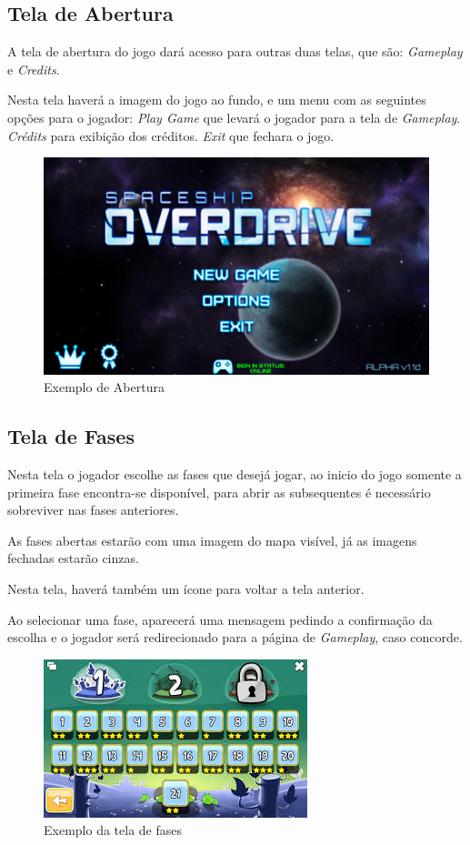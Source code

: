 \documentclass[11pt]{article} %
\begin{document}
\subsection{Tela de Abertura}
A tela de abertura do jogo dará acesso para outras duas telas, que são: \textit{Gameplay} e \textit{Credits}.

Nesta tela haverá a imagem do jogo ao fundo, e um menu com as seguintes opções para o jogador: 
\textit{Play Game} que levará o jogador para a tela de \textit{Gameplay}.
\textit{Crédits} para exibição dos créditos.
\textit{Exit} que fechara o jogo.

\begin{figure}[!htp]
\centering
\includegraphics[scale=0.4]{res/abertura.png}
\caption{Exemplo de Abertura}
\label{Abertura}
\end{figure}

\subsection{Tela de Fases}
Nesta tela o jogador escolhe as fases que desejá jogar, ao inicio do jogo somente a primeira fase encontra-se disponível, para abrir as subsequentes é necessário sobreviver nas fases anteriores.

As fases abertas estarão com uma imagem do mapa visível, já as imagens fechadas estarão cinzas.

Nesta tela, haverá também um ícone para voltar a tela anterior.  

Ao selecionar uma fase, aparecerá uma mensagem pedindo a confirmação da escolha e o jogador será redirecionado para a página de \textit{Gameplay}, caso concorde.

\begin{figure}[!htp]
\centering
\includegraphics[scale=1]{res/fases.jpg}
\caption{Exemplo da tela de fases}
\label{Fases}
\end{figure}
\end{document}
